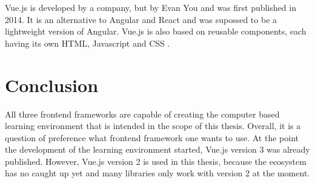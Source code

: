 Vue.js is developed by a company, but by Evan You and was first published in 2014. It is an alternative to Angular and React and was supossed to be a lightweight version of Angular. Vue.js is also based on reusable components, each having its own HTML, Javascript and CSS \cite{Vue}.


\section{Conclusion}

All three frontend frameworks are capable of creating the computer based learning environment that is intended in the scope of this thesis. Overall, it is a question of preference what frontend framework one wants to use. At the point the development of the learning environment started, Vue.js version 3 was already published. However, Vue.js version 2 is used in this thesis, because the ecosystem has no caught up yet and many libraries only work with version 2 at the moment.

% 
